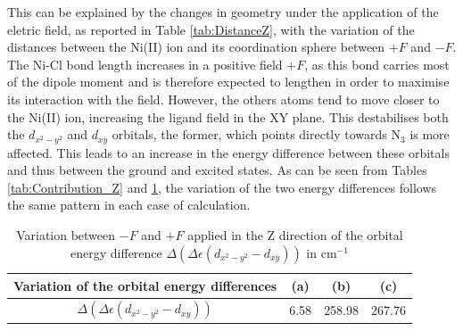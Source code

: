 \documentclass[12pt]{report}
\numberwithin{equation}{section}
\begin{document}
This can be explained by the changes in geometry under the application of the eletric field, as reported in Table \ref{tab:DistanceZ}, with the variation of the distances between the Ni(II) ion and its coordination sphere between $+F$ and $-F$.
The Ni-Cl bond length increases in a positive field $+F$, as this bond carries most of the dipole moment and is therefore expected to lengthen in order to maximise its interaction with the field. 
However, the others atoms tend to move closer to the Ni(II) ion, increasing the ligand field in the XY plane. 
This destabilises both the $d_{x^2-y^2}$ and $d_{xy}$ orbitals, the former, which points directly towards N$_3$ is more affected.
This leads to an increase in the energy difference between these orbitals and thus between the ground and excited states.
As can be seen from Tables \ref{tab:Contribution_Z} and \ref{tab:EOrbitaleZ}, the variation of the two energy differences follows the same pattern in each case of calculation.

\begin{table}[h]
    \centering
    \begin{tabular}{|c | c c c |}
        \hline
        Variation of the orbital energy differences & (a) & (b) & (c)\\
        \hline
        $\Delta(\Delta \epsilon (d_{x^2-y^2}-d_{xy}))$& 6.58 & 258.98 & 267.76\\
        \hline
    \end{tabular}
    \caption{Variation between $-F$ and $+F$ applied in the Z direction of the orbital energy difference $\Delta(\Delta \epsilon (d_{x^2-y^2}-d_{xy}))$ in cm$^{-1}$}
    \label{tab:EOrbitaleZ}
\end{table}
\end{document}
